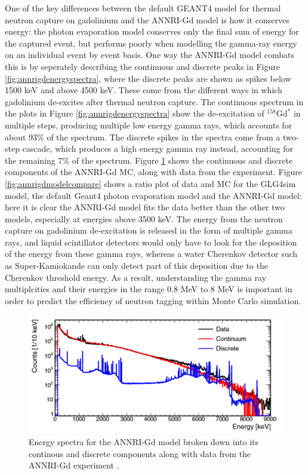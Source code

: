 One of the key differences between the default GEANT4 model for thermal neutron capture on gadolinium and the ANNRI-Gd model is how it conserves energy: the photon evaporation model conserves only the final sum of energy for the captured event, but performs poorly when modelling the gamma-ray energy on an individual event by event basis. One way the ANNRI-Gd model combats this is by seperately describing the continuous and discrete peaks in Figure \ref{fig:annrigdenergyspectra}, where the discrete peaks are shown as spikes below 1500 keV and above 4500 keV. These come from the different ways in which gadolinium de-excites after thermal neutron capture. The continuous spectrum in the plots in Figure \ref{fig:annrigdenergyspectra} show the de-excitation of ${ }^{158} \mathrm{Gd}^{*}$ in multiple steps, producing multiple low energy gamma rays, which accounts for about 93\% of the spectrum. The discrete spikes in the spectra come from a two-step cascade, which produces a high energy gamma ray instead, accounting for the remaining 7\% of the spectrum.
Figure \ref{fig:continousdiscrete} shows the continuous and discrete components of the ANNRI-Gd MC, along with data from the experiment. Figure \ref{fig:annrigdmodelcompare} shows a ratio plot of data and MC for the GLG4sim model, the default Geant4 photon evaporation model and the ANNRI-Gd model: here it is clear the ANNRI-Gd model fits the data better than the other two models, especially at energies above 3500 keV. The energy from the neutron capture on gadolinium de-excitation is released in the form of multiple gamma rays, and liquid scintillator detectors would only have to look for the deposition of the energy from these gamma rays, whereas a water Cherenkov detector such as Super-Kamiokande can only detect part of this deposition due to the Cherenkov threshold energy. As a result, understanding the gamma ray multiplcities and their energies in the range 0.8 MeV to 8 MeV is important in order to predict the efficiency of neutron tagging within Monte Carlo simulation.


\begin{figure}[htp]
    \centering
\includegraphics[width=\textwidth]{Figures/continousdiscrete.png}
\caption[Energy spectra for the ANNRI-Gd model broken down into its continous and discrete components along with data from the ANNRI-Gd experiment.]{Energy spectra for the ANNRI-Gd model broken down into its continous and discrete components along with data from the ANNRI-Gd experiment \cite{annri_gd_energy}.}
\label{fig:continousdiscrete}
\end{figure}

